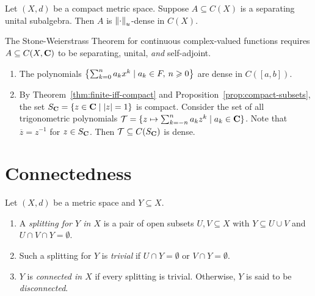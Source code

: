     \begin{theorem}
        Let $(X,d)$ be a compact metric space. Suppose $A \subseteq C(X)$ is a separating unital subalgebra. Then $A$ is $\lnorm \cdot \rnorm_u$-dense in $C(X)$.
    \end{theorem}

    The Stone-Weierstrass Theorem for continuous complex-valued functions requires $A \subseteq C(X,\bfC)$ to be separating, unital, \textit{and} self-adjoint.

    \begin{example}
        \phantom{a}
        \begin{enumerate}[label = (\arabic*),itemsep=1pt,topsep=3pt]
            \item The polynomials $\left\{ \sum_{k = 0}^n a_k x^k \mid a_k \in F,\h2 n\geq 0 \right\}$ are dense in $C([a,b])$.
            \item By Theorem~\ref{thm:finite-iff-compact} and Proposition~\ref{prop:compact-subsets}, the set $S_\bfC = \{z \in \bfC \mid |z| = 1\}$ is compact. Consider the set of all trigonometric polynomials $\cT = \{z \mapsto \sum_{k=-n}^n a_k z^k \mid a_k \in \bfC\}$. Note that $\overline{z} = z^{-1}$ for $z \in S_\bfC$. Then $\cT \subseteq C(S_\bfC)$ is dense.
        \end{enumerate}
    \end{example}

\section{Connectedness}\label{sec:connectedness}
    \begin{definition}
        Let $(X,d)$ be a metric space and $Y \subseteq X$.
            \begin{enumerate}[label = (\arabic*),itemsep=1pt,topsep=3pt]
                \item A \textit{splitting for $Y$ in $X$} is a pair of open subsets $U,V \subseteq X$ with $Y \subseteq U \cup V$ and $U \cap V \cap Y = \emptyset$.
                \item Such a splitting for $Y$ is \textit{trivial} if $U \cap Y = \emptyset$ or $V \cap Y = \emptyset$.
                \item $Y$ is \textit{connected in $X$} if every splitting is trivial. Otherwise, $Y$ is said to be \textit{disconnected}.
            \end{enumerate}
    \end{definition}

